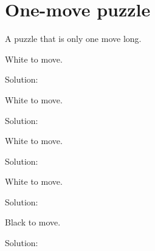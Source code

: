 \documentclass{book}
\begin{document}
\section{One-move puzzle}
A puzzle that is only one move long.\begin{multicols}{2} 
\begin{samepage} 
\newgame 


 
\showboard
 
 White to move. 
 
Solution: 
 
\end{samepage}\begin{samepage} 
\newgame 


 
\showboard
 
 White to move. 
 
Solution: 
 
\end{samepage}\begin{samepage} 
\newgame 


 
\showboard
 
 White to move. 
 
Solution: 
 
\end{samepage}\begin{samepage} 
\newgame 


 
\showboard
 
 White to move. 
 
Solution: 
 
\end{samepage}\begin{samepage} 
\newgame 


 
\showboard
 
 Black to move. 
 
Solution: 
 
\end{samepage}\end{multicols} 
\newpage 
\end{document}
